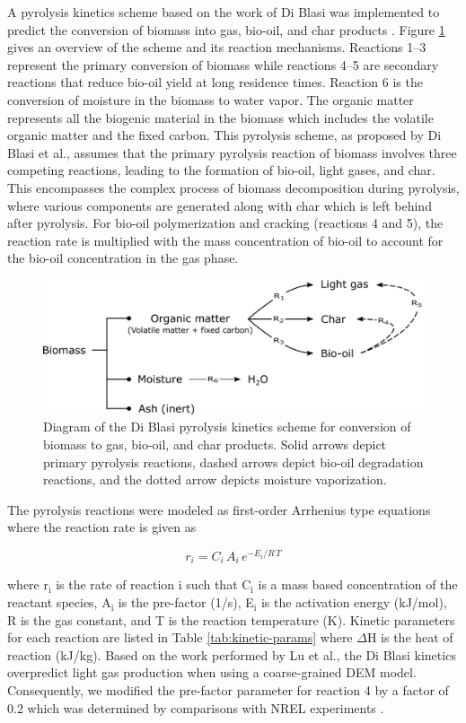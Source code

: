 \documentclass{article}
\begin{document}
A pyrolysis kinetics scheme based on the work of Di Blasi was implemented to predict the conversion of biomass into gas, bio-oil, and char products \cite{Blasi-1993,Blasi-2001}. Figure \ref{fig:blasi} gives an overview of the scheme and its reaction mechanisms. Reactions 1--3 represent the primary conversion of biomass while reactions 4--5 are secondary reactions that reduce bio-oil yield at long residence times. Reaction 6 is the conversion of moisture in the biomass to water vapor. The organic matter represents all the biogenic material in the biomass which includes the volatile organic matter and the fixed carbon. This pyrolysis scheme, as proposed by Di Blasi et al., assumes that the primary pyrolysis reaction of biomass involves three competing reactions, leading to the formation of bio-oil, light gases, and char. This encompasses the complex process of biomass decomposition during pyrolysis, where various components are generated along with char which is left behind after pyrolysis. For bio-oil polymerization and cracking (reactions 4 and 5), the reaction rate is multiplied with the mass concentration of bio-oil to account for the bio-oil concentration in the gas phase.

\begin{figure}[H]
    \centering
    \includegraphics[width=1.0\textwidth]{kinetics.pdf}
    \caption{Diagram of the Di Blasi pyrolysis kinetics scheme for conversion of biomass to gas, bio-oil, and char products. Solid arrows depict primary pyrolysis reactions, dashed arrows depict bio-oil degradation reactions, and the dotted arrow depicts moisture vaporization.}
    \label{fig:blasi}
\end{figure}

\noindent The pyrolysis reactions were modeled as first-order Arrhenius type equations where the reaction rate is given as

\begin{equation}
    r_i = C_i\,A_i\,e^{-E_i / R\,T}
\end{equation}

\noindent where r$_\text{i}$ is the rate of reaction i such that C$_\text{i}$ is a mass based concentration of the reactant species, A$_\text{i}$ is the pre-factor (1/s), E$_\text{i}$ is the activation energy (kJ/mol), R is the gas constant, and T is the reaction temperature (K). Kinetic parameters for each reaction are listed in Table \ref{tab:kinetic-params} where $\Delta$H is the heat of reaction (kJ/kg). Based on the work performed by Lu et al.\cite{lu2020bridging}, the Di Blasi kinetics overpredict light gas production when using a coarse-grained DEM model. Consequently, we modified the pre-factor parameter for reaction 4 by a factor of 0.2 which was determined by comparisons with NREL experiments \cite{French-2021}.
\end{document}
